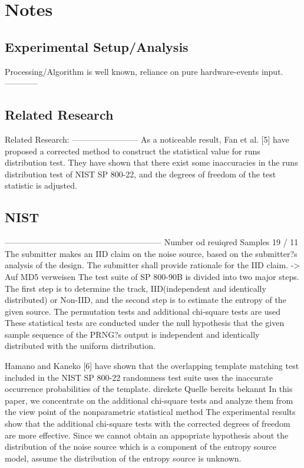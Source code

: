 \chapter{Notes}
\label{cha:notes}

\section{Experimental Setup/Analysis}
Processing/Algorithm is well known, reliance on pure hardware-events input.
------------

\section{Related Research}
 Related Research: 
 ------------------------
 As a noticeable result, Fan et al. [5]
 have proposed a corrected method to construct the statistical
 value for runs distribution test. They have shown that there
 exist some inaccuracies in the runs distribution test of NIST
 SP 800-22, and the degrees of freedom of the test statistic
 is adjusted. 
  \cite{kangadditional}


\section{NIST}



---------------------------------------------------------
 Number od reuiqred Samples 19 / 11 \cite{turan2018nist} 
The submitter makes an IID claim on the noise source, based on the submitter?s analysis of the design. The submitter shall provide rationale for the IID claim. \cite{turan2018nist} -> Auf MD5 verweisen
 The test suite of SP 800-90B is divided into two major steps. The first step is to determine the track, IID(independent and identically distributed) or Non-IID, and the second step is to estimate the entropy of the given source. The permutation tests and additional chi-square tests are used \cite{kangadditional}
These statistical tests are conducted under the null hypothesis that the
given sample sequence of the PRNG?s output is independent
and identically distributed with the uniform distribution.
 \cite{kangadditional}


Hamano and Kaneko [6] have shown that the
overlapping template matching test included in the NIST SP
800-22 randomness test suite uses the inaccurate occurrence
probabilities of the template.
 \cite{kangadditional} direkete Quelle bereits bekannt
In this paper, we concentrate on the additional chi-square tests and analyze them from the view point of the nonparametric
 statistical method \cite{kangadditional}
The experimental results show that the additional chi-square tests with the corrected degrees of freedom are more effective. \cite{kangadditional}
 Since we cannot obtain an appopriate hypothesis about the distribution of the noise source which is a component of the entropy source model, assume the distribution of the entropy source is unknown. \cite{kangadditional}





